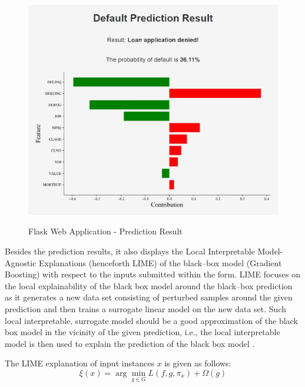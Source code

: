 \begin{figure}[H]
\centering
\caption{Flask Web Application - Prediction Result}\vspace{0.5em}
\label{fig:flaskres}\
\includegraphics[width=130mm]{Figures/flask_app_result.jpg}

\vspace{-1em}
\end{figure}

Besides the prediction results, it also displays the Local Interpretable Model-Agnostic Explanations (henceforth LIME) of the black--box model (Gradient Boosting) with respect to the inputs submitted within the form.
LIME focuses on the local explainability of the black box model around the black--box prediction as it generates a new data set consisting of perturbed samples around the given prediction and then trains a surrogate linear model on the new data set.
Such local interpretable, surrogate model should be a good approximation of the black box model in the vicinity of the given prediction, i.e., the local interpretable model is then used to explain the prediction of the black box model \citep{ribeiro2016should}.

The LIME explanation of input instances $x$ is given as follows:
\begin{equation}\label{eq}
\xi(x) = \arg\min_{g \in G} L(f, g, \pi_x) + \Omega(g)
\end{equation}

